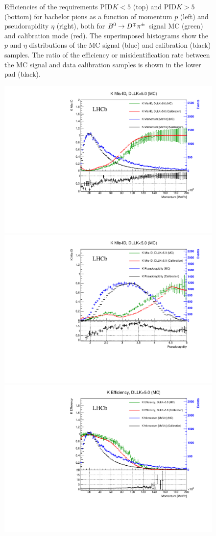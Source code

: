 \begin{figure}[htpb]
\begin{center}
	\end{center}
        \vspace{-2mm}
	\caption{Efficiencies of the requirements PID$K<5$ (top) and PID$K>5$ (bottom) for bachelor pions as a function of momentum $p$
	(left) and pseudorapidity $\eta$ (right), both for $B^0\rightarrow D^\mp\pi^\pm$ signal MC (green) and calibration mode (red).
	 The superimposed histograms show the $p$ and $\eta$ distributions of the MC signal (blue) and calibration (black) samples.
	The ratio of the
	efficiency or misidentification rate between the MC signal and data calibration
	samples is shown in the lower pad (black).}
	\label{fig:PIDKeffPiBac}
\end{figure}
\begin{figure}[t]
	\begin{center}
		\includegraphics[width=0.495\linewidth]{AA-Appdx-pid/figs/Bd2DK_BacK_DLLKlt5_PIDmisID_beforeResampling_P.pdf}
		\includegraphics[width=0.495\linewidth]{AA-Appdx-pid/figs/Bd2DK_BacK_DLLKlt5_PIDmisID_beforeResampling_ETA.pdf} \\
		\includegraphics[width=0.495\linewidth]{AA-Appdx-pid/figs/Bd2DK_BacK_DLLKgt5_PIDeff_beforeResampling_P.pdf}

\end{center}
\end{figure}
